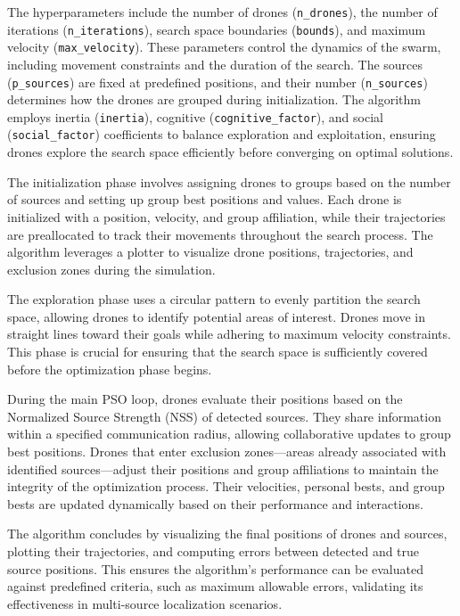 The hyperparameters include the number of drones (\texttt{n\_drones}), the number of iterations (\texttt{n\_iterations}), search space boundaries (\texttt{bounds}), and maximum velocity (\texttt{max\_velocity}). These parameters control the dynamics of the swarm, including movement constraints and the duration of the search. The sources (\texttt{p\_sources}) are fixed at predefined positions, and their number (\texttt{n\_sources}) determines how the drones are grouped during initialization. The algorithm employs inertia (\texttt{inertia}), cognitive (\texttt{cognitive\_factor}), and social (\texttt{social\_factor}) coefficients to balance exploration and exploitation, ensuring drones explore the search space efficiently before converging on optimal solutions.

The initialization phase involves assigning drones to groups based on the number of sources and setting up group best positions and values. Each drone is initialized with a position, velocity, and group affiliation, while their trajectories are preallocated to track their movements throughout the search process. The algorithm leverages a plotter to visualize drone positions, trajectories, and exclusion zones during the simulation.

The exploration phase uses a circular pattern to evenly partition the search space, allowing drones to identify potential areas of interest. Drones move in straight lines toward their goals while adhering to maximum velocity constraints. This phase is crucial for ensuring that the search space is sufficiently covered before the optimization phase begins.

During the main PSO loop, drones evaluate their positions based on the Normalized Source Strength (NSS) of detected sources. They share information within a specified communication radius, allowing collaborative updates to group best positions. Drones that enter exclusion zones—areas already associated with identified sources—adjust their positions and group affiliations to maintain the integrity of the optimization process. Their velocities, personal bests, and group bests are updated dynamically based on their performance and interactions.

The algorithm concludes by visualizing the final positions of drones and sources, plotting their trajectories, and computing errors between detected and true source positions. This ensures the algorithm's performance can be evaluated against predefined criteria, such as maximum allowable errors, validating its effectiveness in multi-source localization scenarios.

